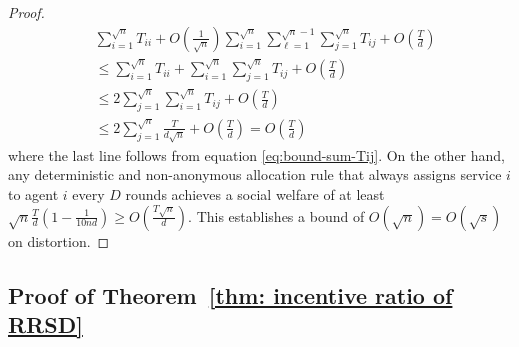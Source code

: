 \documentclass[letterpaper,11pt]{article}
\begin{document}
\begin{proof}
\begin{align*}
&\sum_{i=1}^{\sqrt{n}}T_{ii} + O\left( \frac{1}{\sqrt{n}}\right) \sum_{i=1}^{\sqrt{n}}\sum_{\ell=1}^{\sqrt{n}-1} \sum_{j=1}^{\sqrt{n}} T_{ij} + O\left( \frac{T}{d}\right) \\
&\le \sum_{i=1}^{\sqrt{n}} T_{ii} + \sum_{i=1}^{\sqrt{n}} \sum_{j=1}^{\sqrt{n}} T_{ij} + O\left( \frac{T}{d}\right)  \\
&\le 2 \sum_{j=1}^{\sqrt{n}} \sum_{i=1}^{\sqrt{n}} T_{ij} +  O\left( \frac{T}{d}\right)  \\
& \le 2 \sum_{j=1}^{\sqrt{n}} \frac{T}{d\sqrt{n}} + O\left(\frac{T}{d}\right) = O\left(\frac{T}{d}\right)
\end{align*}
where the last line follows from equation \eqref{eq:bound-sum-Tij}. On the other hand, any deterministic and non-anonymous allocation rule that always assigns service $i$ to agent $i$ every $D$ rounds achieves a social welfare of at least $\sqrt{n}\frac{T}{d}(1 - \frac{1}{10nd}) \ge O\left(\frac{T \sqrt{n}}{d} \right)$. This establishes a bound of $O(\sqrt{n}) = O(\sqrt{s})$ on distortion.
\end{proof}

\subsection{Proof of Theorem~\ref{thm: incentive ratio of RRSD}}
\end{document}
